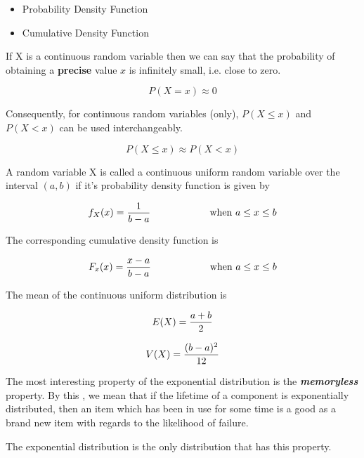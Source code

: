 \documentclass[12pt]{report}
\begin{document}
{\LARGE
	
	\begin{itemize}
		\item Probability Density Function
		\item Cumulative Density Function
	\end{itemize}
	
	
	If X is a continuous random variable then we can say that the probability of obtaining a \textbf{precise} value $x$ is infinitely small, i.e. close to zero.
	
	\[P(X=x) \approx 0 \]
	
	Consequently, for continuous random variables (only),  $P(X \leq x)$ and $P(X < x)$ can be used interchangeably.
	
	\[P(X \leq x) \approx P(X < x) \]
	
	
}

{\LARGE
	A random variable X is called a continuous uniform random variable over the interval $(a,b)$ if it's probability density function is given by
	
	\[ f_{X}(x)  =  { 1 \over b-a}   \hspace{2cm}  \mbox{ when } a \leq x \leq b\]
	
	The corresponding cumulative density function is
	
	\[ F_x(x) = { x-a \over b-a}   \hspace{2cm}  \mbox{ when } a \leq x \leq b\]
	
}


{\LARGE
	
	The mean of the continuous uniform distribution is
	
	\[ E(X) = {a+b \over 2}\]
	
	\[ V(X) = {(b-a)^2\over12}\]
}


{\LARGE
	The most interesting property of the exponential distribution is the \textbf{\emph{memoryless}} property. By this , we mean that if  the lifetime of a component is exponentially distributed, then an item which has been in use for some time is a good as a brand new item with regards to the likelihood of failure.
	
	The exponential distribution is the only distribution that has this property.
}
\end{document}
